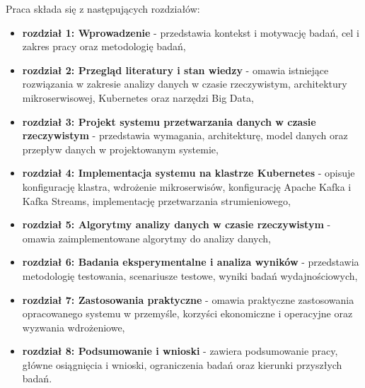Praca składa się z następujących rozdziałów:

\begin{itemize}
    \item \textbf{rozdział 1: Wprowadzenie} - przedstawia kontekst i motywację badań, cel i zakres pracy oraz metodologię badań,
    \item \textbf{rozdział 2: Przegląd literatury i stan wiedzy} - omawia istniejące rozwiązania w zakresie analizy danych w czasie rzeczywistym, architektury mikroserwisowej, Kubernetes oraz narzędzi Big Data,
    \item \textbf{rozdział 3: Projekt systemu przetwarzania danych w czasie rzeczywistym} - przedstawia wymagania, architekturę, model danych oraz przepływ danych w projektowanym systemie,
    \item \textbf{rozdział 4: Implementacja systemu na klastrze Kubernetes} - opisuje konfigurację klastra, wdrożenie mikroserwisów, konfigurację Apache Kafka i Kafka Streams, implementację przetwarzania strumieniowego,
    \item \textbf{rozdział 5: Algorytmy analizy danych w czasie rzeczywistym} - omawia zaimplementowane algorytmy do analizy danych,
    \item \textbf{rozdział 6: Badania eksperymentalne i analiza wyników} - przedstawia metodologię testowania, scenariusze testowe, wyniki badań wydajnościowych,
    \item \textbf{rozdział 7: Zastosowania praktyczne} - omawia praktyczne zastosowania opracowanego systemu w przemyśle, korzyści ekonomiczne i operacyjne oraz wyzwania wdrożeniowe,
    \item \textbf{rozdział 8: Podsumowanie i wnioski} - zawiera podsumowanie pracy, główne osiągnięcia i wnioski, ograniczenia badań oraz kierunki przyszłych badań.
\end{itemize} 